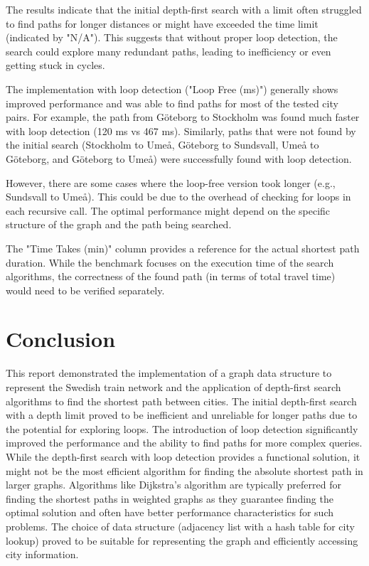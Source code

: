 \documentclass[a4paper,11pt]{article}
\begin{document}
The results indicate that the initial depth-first search with a limit often struggled to find paths for longer distances or might have exceeded the time limit (indicated by "N/A"). This suggests that without proper loop detection, the search could explore many redundant paths, leading to inefficiency or even getting stuck in cycles.

The implementation with loop detection ("Loop Free (ms)") generally shows improved performance and was able to find paths for most of the tested city pairs. For example, the path from Göteborg to Stockholm was found much faster with loop detection (120 ms vs 467 ms). Similarly, paths that were not found by the initial search (Stockholm to Umeå, Göteborg to Sundsvall, Umeå to Göteborg, and Göteborg to Umeå) were successfully found with loop detection.

However, there are some cases where the loop-free version took longer (e.g., Sundsvall to Umeå). This could be due to the overhead of checking for loops in each recursive call. The optimal performance might depend on the specific structure of the graph and the path being searched.

The "Time Takes (min)" column provides a reference for the actual shortest path duration. While the benchmark focuses on the execution time of the search algorithms, the correctness of the found path (in terms of total travel time) would need to be verified separately.

\section*{Conclusion}
This report demonstrated the implementation of a graph data structure to represent the Swedish train network and the application of depth-first search algorithms to find the shortest path between cities. The initial depth-first search with a depth limit proved to be inefficient and unreliable for longer paths due to the potential for exploring loops. The introduction of loop detection significantly improved the performance and the ability to find paths for more complex queries. While the depth-first search with loop detection provides a functional solution, it might not be the most efficient algorithm for finding the absolute shortest path in larger graphs. Algorithms like Dijkstra's algorithm are typically preferred for finding the shortest paths in weighted graphs as they guarantee finding the optimal solution and often have better performance characteristics for such problems. The choice of data structure (adjacency list with a hash table for city lookup) proved to be suitable for representing the graph and efficiently accessing city information.
\end{document}
